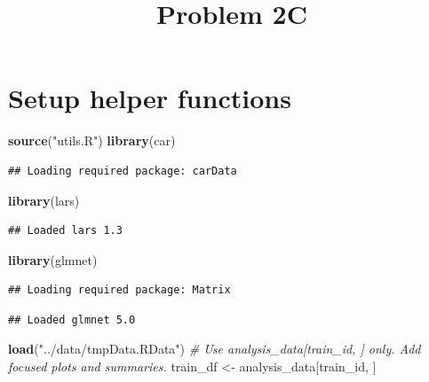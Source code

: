 \documentclass[
]{article}
\title{Problem 2C}
\author{}
\date{\vspace{-2.5em}}
\newenvironment{Shaded}{\begin{snugshade}}{\end{snugshade}}
\newcommand{\CommentTok}[1]{\textcolor[rgb]{0.56,0.35,0.01}{\textit{#1}}}
\newcommand{\FunctionTok}[1]{\textcolor[rgb]{0.13,0.29,0.53}{\textbf{#1}}}
\newcommand{\NormalTok}[1]{#1}
\newcommand{\OtherTok}[1]{\textcolor[rgb]{0.56,0.35,0.01}{#1}}
\newcommand{\StringTok}[1]{\textcolor[rgb]{0.31,0.60,0.02}{#1}}
\begin{document}
\maketitle

\section{Setup helper functions}\label{setup-helper-functions}

\begin{Shaded}
\begin{Highlighting}[]
\FunctionTok{source}\NormalTok{(}\StringTok{"utils.R"}\NormalTok{)}
\FunctionTok{library}\NormalTok{(car)}
\end{Highlighting}
\end{Shaded}

\begin{verbatim}
## Loading required package: carData
\end{verbatim}

\begin{Shaded}
\begin{Highlighting}[]
\FunctionTok{library}\NormalTok{(lars)}
\end{Highlighting}
\end{Shaded}

\begin{verbatim}
## Loaded lars 1.3
\end{verbatim}

\begin{Shaded}
\begin{Highlighting}[]
\FunctionTok{library}\NormalTok{(glmnet)}
\end{Highlighting}
\end{Shaded}

\begin{verbatim}
## Loading required package: Matrix
\end{verbatim}

\begin{verbatim}
## Loaded glmnet 5.0
\end{verbatim}

\begin{Shaded}
\begin{Highlighting}[]
\FunctionTok{load}\NormalTok{(}\StringTok{"../data/tmpData.RData"}\NormalTok{)}
\CommentTok{\# Use analysis\_data[train\_id, ] only. Add focused plots and summaries.}
\NormalTok{train\_df }\OtherTok{\textless{}{-}}\NormalTok{ analysis\_data[train\_id, ]}
\end{Highlighting}
\end{Shaded}
\end{document}
